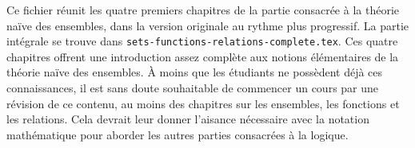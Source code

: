 \documentclass[../../include/open-logic-part]{subfiles}
\begin{document}

\begin{editorial}
  Ce fichier réunit les quatre premiers chapitres de la partie
  consacrée à la théorie naïve des ensembles, dans la version
  originale au rythme plus progressif. La partie intégrale se trouve
  dans \verb|sets-functions-relations-complete.tex|. Ces quatre chapitres
  offrent une introduction assez complète aux notions élémentaires de la
  théorie naïve des ensembles. À moins que les étudiants ne possèdent déjà
  ces connaissances, il est sans doute souhaitable de commencer un
  cours par une révision de ce contenu, au moins des chapitres sur les
  ensembles, les fonctions et les relations. Cela devrait leur donner
  l'aisance nécessaire avec la notation mathématique pour aborder les
  autres parties consacrées à la logique.
\end{editorial}





\OLEndPartHook
\end{document}

